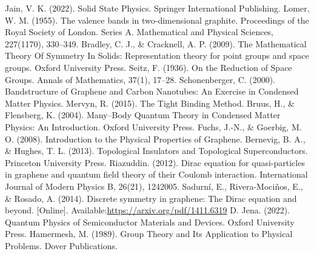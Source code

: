 \begin{thebibliography}{X}
	 Jain, V. K. (2022). Solid State Physics. Springer International Publishing.
	 Lomer, W. M. (1955). The valence bands in two-dimensional graphite. Proceedings of the Royal Society of London. Series A. Mathematical and Physical Sciences, 227(1170), 330–349.
	Bradley, C. J., \& Cracknell, A. P. (2009). The Mathematical Theory Of Symmetry In Solids: Representation theory for point groups and space groups. Oxford University Press.
	Seitz, F. (1936). On the Reduction of Space Groups. Annals of Mathematics, 37(1), 17–28.
	Schonenberger, C. (2000). Bandstructure of Graphene and Carbon Nanotubes: An Exercise in Condensed Matter Physics.
	Mervyn, R. (2015). The Tight Binding Method.
		Bruus, H., \& Flensberg, K. (2004). Many–Body Quantum Theory in Condensed Matter Physics: An Introduction. Oxford University Press.
	Fuchs, J.-N., \& Goerbig, M. O. (2008). Introduction to the Physical Properties of Graphene.
	Bernevig, B. A., \& Hughes, T. L. (2013). Topological Insulators and Topological Superconductors. Princeton University Press.
	Riazuddin. (2012). Dirac equation for quasi-particles in graphene and quantum field theory of their Coulomb interaction. International Journal of Modern Physics B, 26(21), 1242005.
	 Sadurní, E., Rivera-Mociños, E., \& Rosado, A. (2014). Discrete symmetry in graphene: The Dirac equation and beyond. [Online]. Available:\url{https://arxiv.org/pdf/1411.6319}
	D. Jena. (2022). Quantum Physics of Semiconductor Materials and Devices. Oxford University Press.
	Hamermesh, M. (1989). Group Theory and Its Application to Physical Problems. Dover Publications.
\end{thebibliography}
